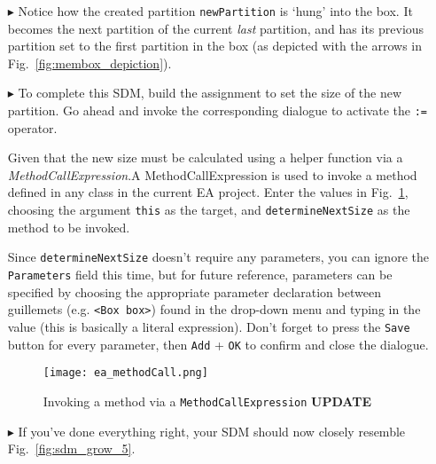 \begin{itemize}
\item[$\blacktriangleright$] Notice how the created partition \texttt{newPartition} is `hung' into the box. It becomes the next partition of the current
\emph{last} partition, and has its previous partition set to the first partition in the box (as depicted with the arrows in Fig.~\ref{fig:membox_depiction}).
  
\item[$\blacktriangleright$] To complete this SDM, build the assignment to set the size of the new partition. Go ahead and invoke the corresponding dialogue to
activate the \texttt{:=} operator.

Given that the new size must be calculated using a helper function via a \emph{MethodCallExpression}.A MethodCallExpression is
used to invoke a method defined in any class in the current EA project. Enter the values in Fig.~\ref{fig:sdm_grow_4}, choosing the argument \texttt{this} as
the target, and \texttt{determineNextSize} as the method to be invoked. 

Since \texttt{determineNextSize} doesn't require any parameters, you can ignore the \texttt{Parameters} field this time, but for future reference, parameters
can be specified by choosing the appropriate parameter declaration between guillemets (e.g. \texttt{<Box box>}) found in the drop-down menu and typing in the
value (this is basically a literal expression). Don't forget to press the \texttt{Save} button for every parameter, then \texttt{Add} + \texttt{OK} to confirm
and close the dialogue.
 
\begin{figure}[htbp]
\begin{center}
  \texttt{[image: ea\_methodCall.png]}
  \caption{Invoking a method via a \texttt{MethodCallExpression} {\bf UPDATE}}  
  \label{fig:sdm_grow_4} 
\end{center}
\end{figure}

\item[$\blacktriangleright$]  If you've done everything right, your SDM should now closely resemble Fig.~\ref{fig:sdm_grow_5}. 



\end{itemize}
